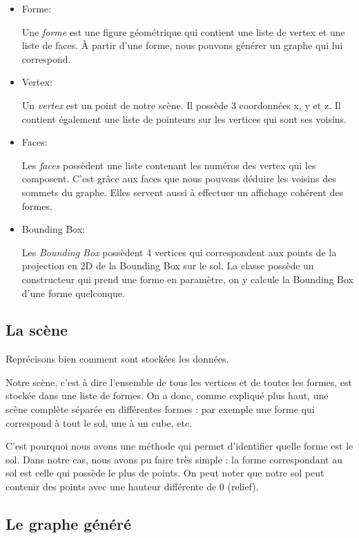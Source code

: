 \documentclass[a4paper,12pt]{report}
\begin{document}
\begin{itemize}
 \item Forme:

Une \textit{forme} est une figure géométrique qui contient une liste de vertex et une liste de faces. À partir d'une forme, nous pouvons générer un graphe qui lui correspond.
 
 \item Vertex:

Un \textit{vertex} est un point de notre scène. Il possède 3 coordonnées x, y et z. Il contient également une liste de pointeurs sur les vertices qui sont ses voisins.

 \item Faces:

Les \textit{faces} possèdent une liste contenant les numéros des vertex qui les composent. C'est grâce aux faces que nous pouvons déduire les voisins des sommets du graphe. Elles servent aussi à effectuer un affichage cohérent des formes.

 \item Bounding Box:

Les \textit{Bounding Box} possèdent 4 vertices qui correspondent aux points de la projection en 2D de la Bounding Box sur le sol. La classe possède un constructeur qui prend une forme en paramètre, on y calcule la Bounding Box d'une forme quelconque.

\end{itemize}


\subsection{La scène}

Reprécisons bien comment sont stockées les données.

Notre scène, c'est à dire l'ensemble de tous les vertices et de toutes les formes, est stockée dans une liste de formes. On a donc, comme expliqué plus haut, une scène complète séparée en différentes formes : par exemple une forme qui correspond à tout le sol, une à un cube, etc.

C'est pourquoi nous avons une méthode qui permet d'identifier quelle forme est le sol. Dans notre cas, nous avons pu faire très simple : la forme correspondant au sol est celle qui possède le plus de points. On peut noter que notre sol peut contenir des points avec une hauteur différente de 0 (relief).

\subsection{Le graphe généré}
\end{document}
